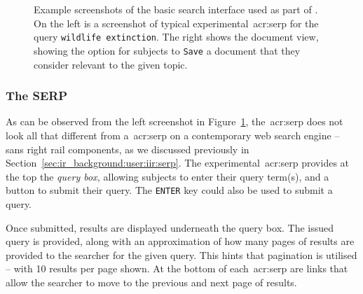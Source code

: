 \begin{figure}[t!]
    \centering
    \caption[Example screenshots of the experimental interfaces]{Example screenshots of the basic search interface used as part of \treconomics. On the left is a screenshot of typical experimental~\gls{acr:serp} for the query \texttt{wildlife extinction}. The right shows the document view, showing the option for subjects to \texttt{Save} a document that they consider relevant to the given topic.}
    \label{fig:interfaces}
\end{figure}

\subsubsection{The SERP}\label{sec:methodology:user:interface:serp}
As can be observed from the left screenshot in Figure~\ref{fig:interfaces}, the~\gls{acr:serp} does not look all that different from a~\gls{acr:serp} on a contemporary web search engine -- sans right rail components, as we discussed previously in Section~\ref{sec:ir_background:user:iir:serp}. The experimental~\gls{acr:serp} provides at the top the \emph{query box,} allowing subjects to enter their query term(s), and a button to submit their query. The \texttt{ENTER} key could also be used to submit a query.

Once submitted, results are displayed underneath the query box. The issued query is provided, along with an approximation of how many pages of results are provided to the searcher for the given query. This hints that pagination is utilised -- with 10 results per page shown. At the bottom of each~\gls{acr:serp} are links that allow the searcher to move to the previous and next page of results.

\begin{figure}[h]
    \centering
    \vspace{4mm}
    \label{fig:serp_buttons}
    \vspace{-5mm}
\end{figure}

